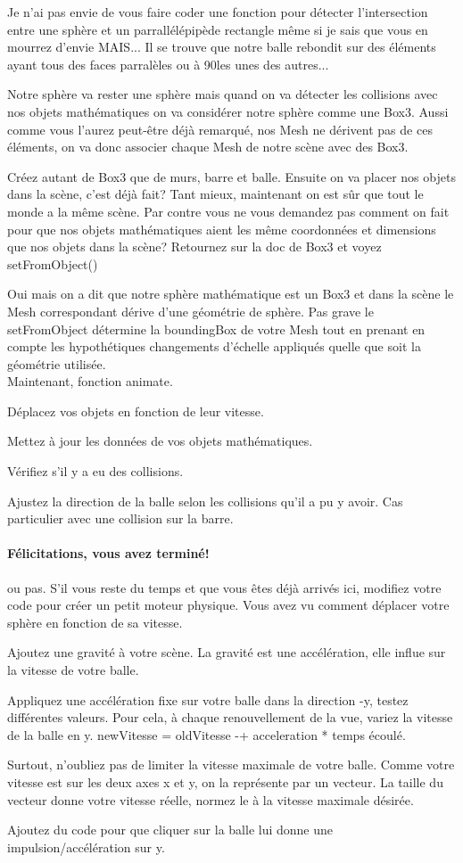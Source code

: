 \documentclass[a4paper,10pt]{article}
\begin{document}
Je n'ai pas envie de vous faire coder une fonction pour détecter l'intersection entre une sphère et un parrallélépipède rectangle même si je sais que vous en mourrez d'envie MAIS...
Il se trouve que notre balle rebondit sur des éléments ayant tous des faces parralèles ou à 90\textdegree les unes des autres...

Notre sphère va rester une sphère mais quand on va détecter les collisions avec nos objets mathématiques on va considérer notre sphère comme une Box3.
Aussi comme vous l'aurez peut-être déjà remarqué, nos Mesh ne dérivent pas de ces éléments, on va donc associer chaque Mesh de notre scène avec des Box3.

Créez autant de Box3 que de murs, barre et balle.
Ensuite on va placer nos objets dans la scène, c'est déjà fait? Tant mieux, maintenant on est sûr que tout le monde a la même scène.
Par contre vous ne vous demandez pas comment on fait pour que nos objets mathématiques aient les même coordonnées et dimensions que nos objets dans la scène?
Retournez sur la doc de Box3 et voyez setFromObject()

Oui mais on a dit que notre sphère mathématique est un Box3 et dans la scène le Mesh correspondant dérive d'une géométrie de sphère.
Pas grave le setFromObject détermine la boundingBox de votre Mesh tout en prenant en compte les hypothétiques changements d'échelle appliqués quelle que soit la géométrie utilisée.\\

Maintenant, fonction animate.

Déplacez vos objets en fonction de leur vitesse.

Mettez à jour les données de vos objets mathématiques.

Vérifiez s'il y a eu des collisions.

Ajustez la direction de la balle selon les collisions qu'il a pu y avoir.
Cas particulier avec une collision sur la barre.


\paragraph{Félicitations, vous avez terminé!}

ou pas. S'il vous reste du temps et que vous êtes déjà arrivés ici, modifiez votre code pour créer un petit moteur physique.
Vous avez vu comment déplacer votre sphère en fonction de sa vitesse.

Ajoutez une gravité à votre scène. La gravité est une accélération, elle influe sur la vitesse de votre balle.

Appliquez une accélération fixe sur votre balle dans la direction -y, testez différentes valeurs.
Pour cela, à chaque renouvellement de la vue, variez la vitesse de la balle en y. newVitesse = oldVitesse -+  acceleration * temps écoulé.

Surtout, n'oubliez pas de limiter la vitesse maximale de votre balle. Comme votre vitesse est sur les deux axes x et y, on la représente par un vecteur. La taille du vecteur donne votre vitesse réelle, normez le à la vitesse maximale désirée.

Ajoutez du code pour que cliquer sur la balle lui donne une impulsion/accélération sur y.
\end{document}
